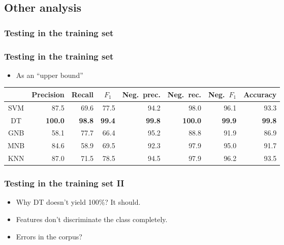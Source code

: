 \subsection{Other analysis}

\subsubsection{Testing in the training set}
\begin{frame}
    \frametitle{Testing in the training set}

    \begin{itemize}
        \item As an ``upper bound''
    \end{itemize}

    \begin{center}
        \scriptsize
        \begin{tabular}{ c r r r r r r r }
            & \multicolumn{1}{c}{Precision} & \multicolumn{1}{c}{Recall} & \multicolumn{1}{c}{$F_1$} & \multicolumn{1}{c}{Neg.\ prec.} & \multicolumn{1}{c}{Neg.\ rec.} & \multicolumn{1}{c}{Neg.\ $F_1$} & \multicolumn{1}{c}{Accuracy} \\
            \midrule
            SVM & 87.5 & 69.6 & 77.5 & 94.2 & 98.0 & 96.1 & 93.3 \\
            \midrule
            DT & \textbf{100.0} & \textbf{98.8} & \textbf{99.4} & \textbf{99.8} & \textbf{100.0} & \textbf{99.9} & \textbf{99.8} \\
            \midrule
            GNB & 58.1 & 77.7 & 66.4 & 95.2 & 88.8 & 91.9 & 86.9 \\
            \midrule
            MNB & 84.6 & 58.9 & 69.5 & 92.3 & 97.9 & 95.0 & 91.7 \\
            \midrule
            KNN & 87.0 & 71.5 & 78.5 & 94.5 & 97.9 & 96.2 & 93.5 \\
        \end{tabular}
    \end{center}
\end{frame}

\begin{frame}
    \frametitle{Testing in the training set II}

    \begin{itemize}
        \item Why DT doesn't yield 100\%? It should.
        \item Features don't discriminate the class completely.
        \item Errors in the corpus?
    \end{itemize}
\end{frame}

